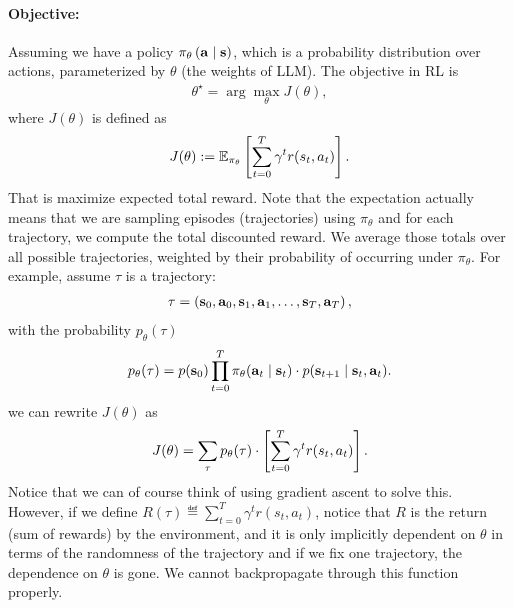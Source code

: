 \documentclass[11pt]{article}  %
\begin{document}
\paragraph{Objective:} Assuming we have a policy $\pi_{\theta}\left( \mathbf{a} \mid \mathbf{s} \right)$, which is a probability distribution over actions, parameterized by $\theta$ (the weights of LLM).
The objective in RL is 
\begin{align*}
  \theta^\star = \arg\max_{\theta} J(\theta),
\end{align*}
where $J(\theta)$ is defined as 
\begin{align}
  \label{eq:J}
  J(\theta) := \mathbb{E}_{\pi_\theta}\left[\sum_{t=0}^{T}\gamma^tr(s_t, a_t)\right].
\end{align}
That is maximize expected total reward.
Note that the expectation actually means that we are sampling episodes (trajectories) using $\pi_{\theta}$ and for each trajectory, we compute the total discounted reward.
We average those totals over all possible trajectories, weighted by their probability of occurring under $\pi_\theta$.
For example, assume $\tau$ is a trajectory:
\begin{align*}
  \tau = \left( \mathbf{s}_0, \mathbf{a}_0, \mathbf{s}_1, \mathbf{a}_1, \hdots, \mathbf{s}_T, \mathbf{a}_T \right),
\end{align*} 
with the probability $p_\theta(\tau)$
\begin{align*}
  p_{\theta}(\tau) = p(\mathbf{s}_0)\prod_{t=0}^{T}\pi_{\theta}(\mathbf{a}_t \mid \mathbf{s}_t)\cdot p(\mathbf{s}_{t+1} \mid \mathbf{s}_t, \mathbf{a}_t).
\end{align*}
we can rewrite $J(\theta)$ as 
\begin{align*}
  J(\theta) = \sum_{\tau} p_\theta(\tau)\cdot\left[ \sum_{t=0}^{T}\gamma^tr(s_t, a_t) \right].
\end{align*}
Notice that we can of course think of using gradient ascent to solve this. 
However, if we define $R(\tau) \eqdef \sum_{t=0}^{T}\gamma^tr(s_t, a_t)$, notice that $R$ is the return (sum of rewards) by the environment, and it is only implicitly dependent on $\theta$ in terms of the randomness of the trajectory and if we fix one trajectory, the dependence on $\theta$ is gone.
We cannot backpropagate through this function properly.
\end{document}
